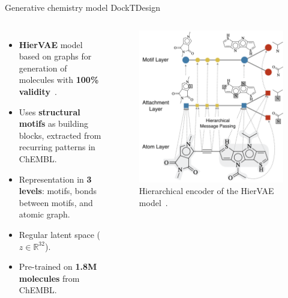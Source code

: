 \documentclass[aspectratio=169,xcolor=dvipsnames]{beamer}
\begin{document}
\begin{frame}{Generative chemistry model \hfill {\footnotesize \alert{DockTDesign}}}
    \begin{columns}[t]
        \begin{itemize}
            \item \textbf{HierVAE} model based on graphs for generation of molecules with \textbf{100\% validity}~\cite{jin2020hierarchical}.
            \item Uses \textbf{structural motifs} as building blocks, extracted from recurring patterns in ChEMBL.
            \item Representation in \textbf{3 levels}: motifs, bonds between motifs, and atomic graph.
            \item Regular latent space ($z \in \mathbb{R}^{32}$).
            \item Pre-trained on \textbf{1.8M molecules} from ChEMBL.
        \end{itemize}

        \begin{figure}
            \centering
            \includegraphics[width=0.785\linewidth]{imgs/hiervae-encoder.png}
            \caption{Hierarchical encoder of the HierVAE model~\cite{jin2020hierarchical}.}
        \end{figure}
    \end{columns}
\end{frame}
\end{document}
